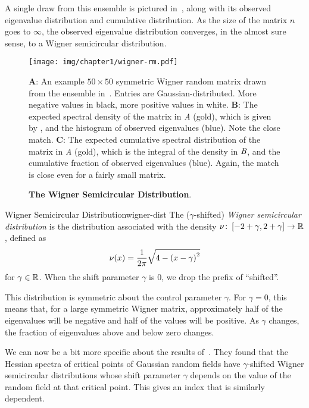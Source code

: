 \documentclass[../../thesis.tex]{subfiles}
\begin{document}
A single draw from this ensemble is pictured
in~,
along with its observed eigenvalue distribution
and cumulative distribution.
As the size of the matrix $n$ goes to $\infty$,
the observed eigenvalue distribution converges,
in the almost sure sense,
to a Wigner semicircular distribution.

\begin{figure}[ht]
	\begin{center}
		\texttt{[image: img/chapter1/wigner-rm.pdf]}
	\end{center}
	\caption{\textbf{The Wigner Semicircular Distribution}.}%
	{\textbf{A}: An example $50\times50$ symmetric Wigner random matrix drawn from the ensemble
		in~. Entries are Gaussian-distributed.
		More negative values in black, more positive values in white.
	\textbf{B}: The expected spectral density of the matrix in \emph{A} (gold),
		which is given by ,
		and the histogram of observed eigenvalues (blue). Note the close match.
	\textbf{C}: The expected cumulative spectral distribution
		of the matrix in \emph{A} (gold), which is the integral of the
		density in $\emph{B}$, and the cumulative fraction of observed eigenvalues (blue).
		Again, the match is close even for a fairly small matrix.
}
\end{figure}

\begin{definition}{Wigner Semicircular Distribution}{wigner-dist}
	The ($\gamma$-shifted) \emph{Wigner semicircular distribution}
	is the distribution associated with the density
	$\nu \colon \left[-2+\gamma, 2+\gamma\right] \to \mathbb{R}$,
	defined as
	\begin{equation}\equationlabel{def-wigner-dist}
		\nu(x) = \frac{1}{2\pi}\sqrt{4 - {(x-\gamma)}^2}
	\end{equation}
	for $\gamma\in\mathbb{R}$.
	When the shift parameter $\gamma$ is $0$,
	we drop the prefix of \enquote{shifted}.
\end{definition}
This distribution is symmetric about the control parameter $\gamma$.
For $\gamma=0$, this means that, for a large symmetric Wigner matrix,
approximately half of the eigenvalues will
be negative and half of the values will be positive.
As $\gamma$ changes, the fraction of eigenvalues above and below zero changes.

We can now be a bit more specific about the results of~\cite{bray2007}.
They found that the Hessian spectra of
critical points of Gaussian random fields
have $\gamma$-shifted Wigner semicircular distributions
whose shift parameter $\gamma$ depends on the value of the random field
at that critical point.
This gives an index that is similarly dependent.
\end{document}
